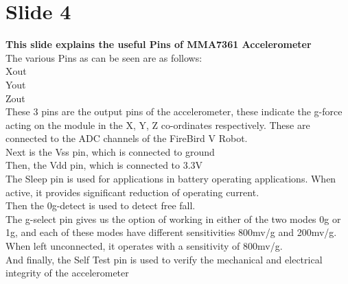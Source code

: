 \documentclass[a4paper,12 pt]{article}
\begin{document}
\section{Slide 4} 
\textbf{This slide explains the useful Pins of MMA7361 Accelerometer}\\
The various Pins as can be seen are as follows:\\
Xout\\
Yout\\
Zout\\
These 3 pins are the output pins of the accelerometer, these indicate the g-force acting on the module in the X, Y, Z co-ordinates respectively. These are connected to the ADC channels of the FireBird V Robot.\\
Next is the Vss pin, which is connected to ground \\
Then, the Vdd pin, which is connected to 3.3V\\
The Sleep pin is used for applications in battery operating applications. When active, it provides significant reduction of operating current.\\
Then the 0g-detect is used to detect free fall.\\
The g-select pin gives us the option of working in either of the two modes 0g or 1g, and each of these modes have different sensitivities 800mv/g and 200mv/g. When left unconnected, it operates with a sensitivity of 800mv/g.\\
And finally, the Self Test pin is used to verify the mechanical and electrical integrity of the accelerometer\\
\end{document}
